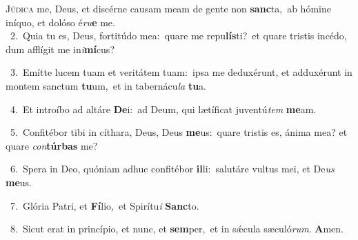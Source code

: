 \lettrine{\initial\textcolor{\initialcolor}{J}}{údica} me, Deus, et discérne causam meam de gente non \textbf{sanc}\-ta,~\star ab hómine iníquo, et dolóso é\-\textit{ru}\-\textbf{e} me.\\
{\numbfont\textcolor{\numbcolor}{~2.}}~Quia tu es, Deus, fortitúdo mea:~\dagger quare me repu\-\textbf{lís}\-ti?~\star et quare tristis incédo, dum afflígit me in\-\textit{i}\-\textbf{mí}cus?\par
{\numbfont\textcolor{\numbcolor}{~3.}}~Emítte lucem tuam et veritátem tuam:~\dagger ipsa me deduxérunt, et adduxérunt in montem sanctum \textbf{tu}\-um,~\star et in tabernácu\textit{la} \textbf{tu}\-a.\par
{\numbfont\textcolor{\numbcolor}{~4.}}~Et introíbo ad altáre \textbf{De}\-i:~\star ad Deum, qui lætíficat juventú\textit{tem} \textbf{me}\-am.\par
{\numbfont\textcolor{\numbcolor}{~5.}}~Confitébor tibi in cíthara, Deus, Deus \textbf{me}\-us:~\star quare tristis es, ánima mea? et quare \textit{con}\-\textbf{túr}\textbf{bas} me?\par
{\numbfont\textcolor{\numbcolor}{~6.}}~Spera in Deo, quóniam adhuc confitébor \textbf{il}\-li:~\star salutáre vultus mei, et De\textit{us} \textbf{me}\-us.\par
{\numbfont\textcolor{\numbcolor}{~7.}}~Glória Patri, et \textbf{Fí}\-lio,~\star et Spirítu\textit{i} \textbf{Sanc}\-to.\par
{\numbfont\textcolor{\numbcolor}{~8.}}~Sicut erat in princípio, et nunc, et \textbf{sem}\-per,~\star et in sǽcula sæculó\-\textit{rum}\-. \textbf{A}\-men.\par
